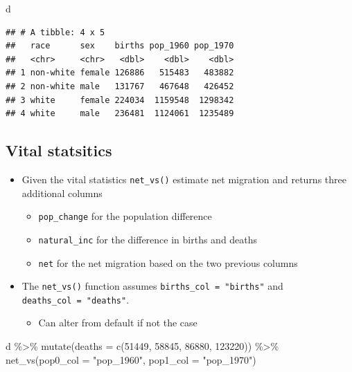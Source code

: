 \documentclass[
]{book}
\newenvironment{Shaded}{\begin{snugshade}}{\end{snugshade}}
\newcommand{\AttributeTok}[1]{\textcolor[rgb]{0.77,0.63,0.00}{#1}}
\newcommand{\DecValTok}[1]{\textcolor[rgb]{0.00,0.00,0.81}{#1}}
\newcommand{\FunctionTok}[1]{\textcolor[rgb]{0.00,0.00,0.00}{#1}}
\newcommand{\NormalTok}[1]{#1}
\newcommand{\SpecialCharTok}[1]{\textcolor[rgb]{0.00,0.00,0.00}{#1}}
\newcommand{\StringTok}[1]{\textcolor[rgb]{0.31,0.60,0.02}{#1}}
\providecommand{\tightlist}{%
  \setlength{\itemsep}{0pt}\setlength{\parskip}{0pt}}
\begin{document}
\begin{Shaded}
\begin{Highlighting}[]
\NormalTok{d}
\end{Highlighting}
\end{Shaded}

\begin{verbatim}
## # A tibble: 4 x 5
##   race      sex    births pop_1960 pop_1970
##   <chr>     <chr>   <dbl>    <dbl>    <dbl>
## 1 non-white female 126886   515483   483882
## 2 non-white male   131767   467648   426452
## 3 white     female 224034  1159548  1298342
## 4 white     male   236481  1124061  1235489
\end{verbatim}

\hypertarget{vital-statsitics-3}{%
\subsection{Vital statsitics}\label{vital-statsitics-3}}

\begin{itemize}
\tightlist
\item
  Given the vital statistics \texttt{net\_vs()} estimate net migration and returns three additional columns

  \begin{itemize}
  \tightlist
  \item
    \texttt{pop\_change} for the population difference
  \item
    \texttt{natural\_inc} for the difference in births and deaths
  \item
    \texttt{net} for the net migration based on the two previous columns
  \end{itemize}
\item
  The \texttt{net\_vs()} function assumes \texttt{births\_col\ =\ "births"} and \texttt{deaths\_col\ =\ "deaths"}.

  \begin{itemize}
  \tightlist
  \item
    Can alter from default if not the case
  \end{itemize}
\end{itemize}

\begin{Shaded}
\begin{Highlighting}[]
\NormalTok{d }\SpecialCharTok{\%\textgreater{}\%}
  \FunctionTok{mutate}\NormalTok{(}\AttributeTok{deaths =} \FunctionTok{c}\NormalTok{(}\DecValTok{51449}\NormalTok{, }\DecValTok{58845}\NormalTok{, }\DecValTok{86880}\NormalTok{, }\DecValTok{123220}\NormalTok{)) }\SpecialCharTok{\%\textgreater{}\%}
  \FunctionTok{net\_vs}\NormalTok{(}\AttributeTok{pop0\_col =} \StringTok{"pop\_1960"}\NormalTok{, }\AttributeTok{pop1\_col =} \StringTok{"pop\_1970"}\NormalTok{)}
\end{Highlighting}
\end{Shaded}
\end{document}
